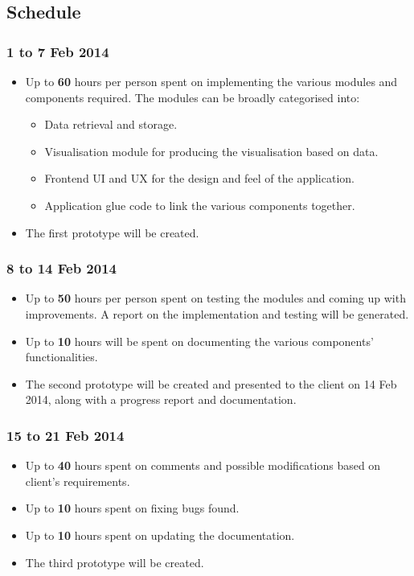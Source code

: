 \documentclass[12pt,a4paper,twoside]{article}
\begin{document}
\subsection{Schedule}

\subsubsection{1 to 7 Feb 2014}
\begin{itemize}
	\item Up to \textbf{60} hours per person spent on implementing the various modules and components required. The modules can be broadly categorised into:
		\begin{itemize}
			\item Data retrieval and storage.
			\item Visualisation module for producing the visualisation based on data.
			\item Frontend UI and UX for the design and feel of the application.
			\item Application glue code to link the various components together.
		\end{itemize}
	\item The first prototype will be created.
\end{itemize}

\subsubsection{8 to 14 Feb 2014}
\begin{itemize}
	\item Up to \textbf{50} hours per person spent on testing the modules and coming up with improvements. A report on the implementation and testing will be generated.
	\item Up to \textbf{10} hours will be spent on documenting the various components' functionalities.
	\item The second prototype will be created and presented to the client on 14 Feb 2014, along with a progress report and documentation.
\end{itemize}

\subsubsection{15 to 21 Feb 2014}
\begin{itemize}
	\item Up to \textbf{40} hours spent on comments and possible modifications based on client's requirements.
	\item Up to \textbf{10} hours spent on fixing bugs found.
	\item Up to \textbf{10} hours spent on updating the documentation.
	\item The third prototype will be created.
\end{itemize}
\end{document}
